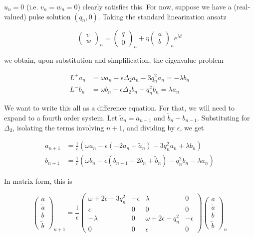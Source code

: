 \documentclass[12pt]{article}
\begin{document}
$u_n = 0$ (i.e. $v_n = w_n = 0$) clearly satisfies this. For now, suppose we have a (real-valued) pulse solution $(q_n, 0)$. Taking the standard linearization ansatz

\[
\begin{pmatrix}v \\ w\end{pmatrix}_n = 
\begin{pmatrix}q \\ 0\end{pmatrix}_n + 
\eta \begin{pmatrix}a \\ b\end{pmatrix}_n e^{\lambda t}
\]

we obtain, upon substitution and simplification, the eigenvalue problem

\begin{align*}
L^+ a_n &= \omega a_n - \epsilon \Delta_2 a_n - 3 q_n^2 a_n = -\lambda b_n \\
L^- b_n &= \omega b_n - \epsilon \Delta_2 b_n - q_n^2 b_n = \lambda a_n
\end{align*}
 
We want to write this all as a difference equation. For that, we will need to expand to a fourth order system. Let $\tilde{a}_n = a_{n-1}$ and $\tilde{b}_n - b_{n-1}$. Substituting for $\Delta_2$, isolating the terms involving $n+1$, and dividing by $\epsilon$, we get

\begin{align*}
a_{n+1} &= \frac{1}{\epsilon}( \omega a_n - \epsilon (- 2 a_n + \tilde{a}_n) - 3 q_n^2 a_n + \lambda b_n ) \\
b_{n+1} &= \frac{1}{\epsilon}( \omega b_n - \epsilon (b_{n+1} - 2 b_n + \tilde{b}_n) - q_n^2 b_n - \lambda a_n )
\end{align*}

In matrix form, this is

\[
\begin{pmatrix}
a \\ \tilde{a} \\ b \\ \tilde{b}
\end{pmatrix}_{n+1} =
\frac{1}{\epsilon}
\begin{pmatrix}
\omega + 2 \epsilon - 3 q_n^2 & -\epsilon & \lambda & 0 \\
\epsilon & 0 & 0 & 0 \\
-\lambda & 0 & \omega + 2 \epsilon - q_n^2 & -\epsilon \\
0 & 0 & \epsilon & 0
\end{pmatrix}
\begin{pmatrix}
a \\ \tilde{a} \\ b \\ \tilde{b}
\end{pmatrix}_{n}
\]
\end{document}
